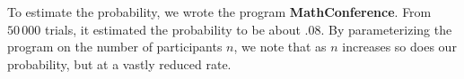 \documentclass{tufte-handout}
\begin{document}
To estimate the probability, we wrote the program
\textbf{\mbox{MathConference}}. From $50\,000$ trials, it estimated
the probability to be about $.08$. By parameterizing the program on
the number of participants $n$, we note that as $n$ increases so does
our probability, but at a vastly reduced rate.
\end{document}
